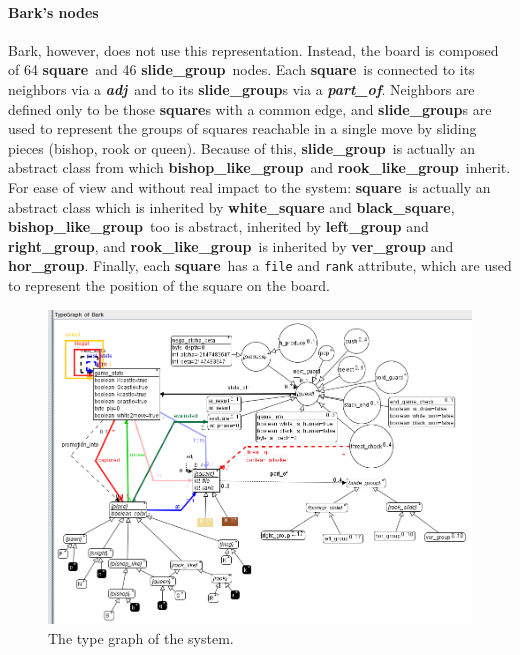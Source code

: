 \documentclass[a4paper, 10pt]{scrartcl}
\newcommand{\noderepr}[1]{\textsf{\textbf{#1}}}
\newcommand{\edgerepr}[1]{\textit{\textbf{#1}}}
\newcommand{\squarenode}{\noderepr{square}}
\newcommand{\slidegroupnode}{\noderepr{slide\_group}}
\newcommand{\bishopgroupnode}{\noderepr{bishop\_like\_group}}
\newcommand{\rookgroupnode}{\noderepr{rook\_like\_group}}
\newcommand{\adj}{\edgerepr{adj}}
\newcommand{\partof}{\edgerepr{part\_of}}
\begin{document}
    \paragraph{Bark's nodes} Bark, however, does not use this representation. Instead, the board is composed of 64 \squarenode\ and 46 \slidegroupnode\  nodes. Each \squarenode\ is connected to its neighbors via a \adj\ and to its \slidegroupnode s via a \partof. Neighbors are defined only to be those \squarenode s with a common edge, and \slidegroupnode s are used to represent the groups of squares reachable in a single move by sliding pieces (bishop, rook or queen). Because of this, \slidegroupnode\ is actually an abstract class from which \bishopgroupnode\ and \rookgroupnode\ inherit.
    For ease of view and without real impact to the system: \squarenode\ is actually an abstract class which is inherited by \noderepr{white\_square} and \noderepr{black\_square}, \bishopgroupnode\ too is abstract, inherited by \noderepr{left\_group} and \noderepr{right\_group}, and \rookgroupnode\ is inherited by \noderepr{ver\_group} and \noderepr{hor\_group}.
    Finally, each \squarenode\ has a \texttt{file} and \texttt{rank} attribute, which are used to represent the position of the square on the board.
    \begin{figure}[H]
        \centering
        \includegraphics[width=.8\linewidth]{images/type_graph.png}
        \caption{The type graph of the system.}
    \end{figure}
\end{document}
